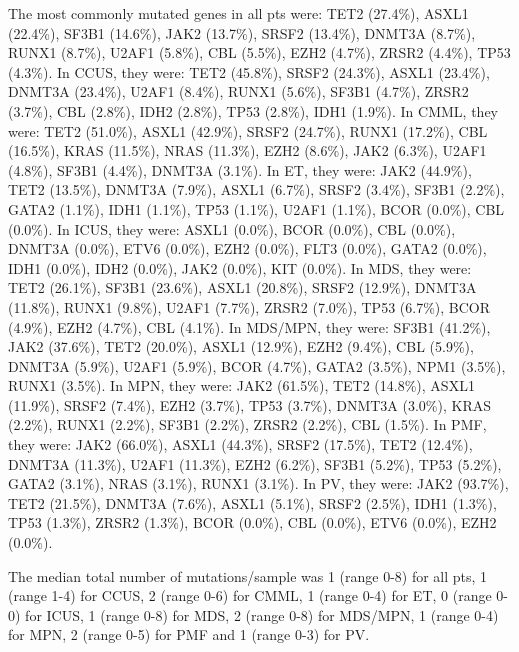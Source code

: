 The most commonly mutated genes in all pts were: TET2 (27.4\%), ASXL1 (22.4\%), SF3B1 (14.6\%), JAK2 (13.7\%), SRSF2 (13.4\%), DNMT3A (8.7\%), RUNX1 (8.7\%), U2AF1 (5.8\%), CBL (5.5\%), EZH2 (4.7\%), ZRSR2 (4.4\%), TP53 (4.3\%). In CCUS, they were: TET2 (45.8\%), SRSF2 (24.3\%), ASXL1 (23.4\%), DNMT3A (23.4\%), U2AF1 (8.4\%), RUNX1 (5.6\%), SF3B1 (4.7\%), ZRSR2 (3.7\%), CBL (2.8\%), IDH2 (2.8\%), TP53 (2.8\%), IDH1 (1.9\%). In CMML, they were: TET2 (51.0\%), ASXL1 (42.9\%), SRSF2 (24.7\%), RUNX1 (17.2\%), CBL (16.5\%), KRAS (11.5\%), NRAS (11.3\%), EZH2 (8.6\%), JAK2 (6.3\%), U2AF1 (4.8\%), SF3B1 (4.4\%), DNMT3A (3.1\%). In ET, they were: JAK2 (44.9\%), TET2 (13.5\%), DNMT3A (7.9\%), ASXL1 (6.7\%), SRSF2 (3.4\%), SF3B1 (2.2\%), GATA2 (1.1\%), IDH1 (1.1\%), TP53 (1.1\%), U2AF1 (1.1\%), BCOR (0.0\%), CBL (0.0\%). In ICUS, they were: ASXL1 (0.0\%), BCOR (0.0\%), CBL (0.0\%), DNMT3A (0.0\%), ETV6 (0.0\%), EZH2 (0.0\%), FLT3 (0.0\%), GATA2 (0.0\%), IDH1 (0.0\%), IDH2 (0.0\%), JAK2 (0.0\%), KIT (0.0\%). In MDS, they were: TET2 (26.1\%), SF3B1 (23.6\%), ASXL1 (20.8\%), SRSF2 (12.9\%), DNMT3A (11.8\%), RUNX1 (9.8\%), U2AF1 (7.7\%), ZRSR2 (7.0\%), TP53 (6.7\%), BCOR (4.9\%), EZH2 (4.7\%), CBL (4.1\%). In MDS/MPN, they were: SF3B1 (41.2\%), JAK2 (37.6\%), TET2 (20.0\%), ASXL1 (12.9\%), EZH2 (9.4\%), CBL (5.9\%), DNMT3A (5.9\%), U2AF1 (5.9\%), BCOR (4.7\%), GATA2 (3.5\%), NPM1 (3.5\%), RUNX1 (3.5\%). In MPN, they were: JAK2 (61.5\%), TET2 (14.8\%), ASXL1 (11.9\%), SRSF2 (7.4\%), EZH2 (3.7\%), TP53 (3.7\%), DNMT3A (3.0\%), KRAS (2.2\%), RUNX1 (2.2\%), SF3B1 (2.2\%), ZRSR2 (2.2\%), CBL (1.5\%). In PMF, they were: JAK2 (66.0\%), ASXL1 (44.3\%), SRSF2 (17.5\%), TET2 (12.4\%), DNMT3A (11.3\%), U2AF1 (11.3\%), EZH2 (6.2\%), SF3B1 (5.2\%), TP53 (5.2\%), GATA2 (3.1\%), NRAS (3.1\%), RUNX1 (3.1\%). In PV, they were: JAK2 (93.7\%), TET2 (21.5\%), DNMT3A (7.6\%), ASXL1 (5.1\%), SRSF2 (2.5\%), IDH1 (1.3\%), TP53 (1.3\%), ZRSR2 (1.3\%), BCOR (0.0\%), CBL (0.0\%), ETV6 (0.0\%), EZH2 (0.0\%).

The median total number of mutations/sample was 1 (range 0-8) for all pts, 1 (range 1-4) for CCUS, 2 (range 0-6) for CMML, 1 (range 0-4) for ET, 0 (range 0-0) for ICUS, 1 (range 0-8) for MDS, 2 (range 0-8) for MDS/MPN, 1 (range 0-4) for MPN, 2 (range 0-5) for PMF and 1 (range 0-3) for PV.



